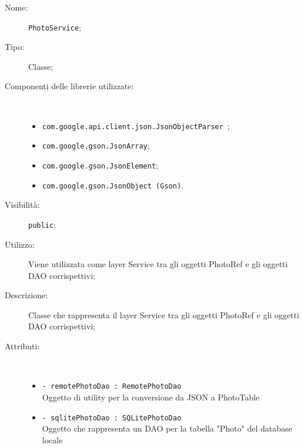 \documentclass[../DefinizioneDiProdotto.tex]{subfiles}
\begin{document}
\begin{description}
	\item[Nome:] \texttt{PhotoService};
	\item[Tipo:] Classe;
	\item[Componenti delle librerie utilizzate:] \
	\begin{itemize}
		\item \texttt{com.google.api.client.json.JsonObjectParser
		};
		
		\item \texttt{com.google.gson.JsonArray};
		
		\item \texttt{com.google.gson.JsonElement};
		
		\item \texttt{com.google.gson.JsonObject (Gson)}.
		
	\end{itemize}
	\item[Visibilità:] \texttt{public};
	\item[Utilizzo:] Viene utilizzata come layer Service tra gli oggetti PhotoRef e gli oggetti DAO corrispettivi;
	\item[Descrizione:] Classe che rappresenta il layer Service tra gli oggetti PhotoRef e gli oggetti DAO corrispettivi;
	\item[Attributi:] \
	\begin{itemize}
		\item \texttt{- remotePhotoDao : RemotePhotoDao}\\
		Oggetto di utility per la conversione da JSON a PhotoTable
		
		\item \texttt{- sqlitePhotoDao : SQLitePhotoDao}\\
		Oggetto che rappresenta un DAO per la tabella "Photo" del database locale
		

\end{itemize}
\end{description}
\end{document}
